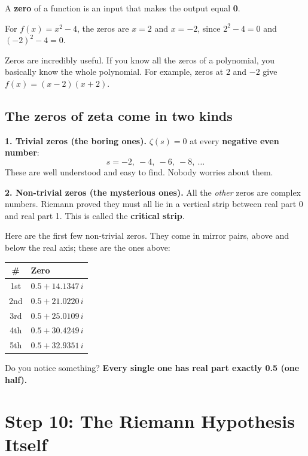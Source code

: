 \documentclass[11pt,a4paper]{article}
\begin{document}
A \textbf{zero} of a function is an input that makes the output equal \textbf{0}.

\begin{example}
For $f(x) = x^2 - 4$, the zeros are $x = 2$ and $x = -2$, since $2^2 - 4 = 0$ and $(-2)^2 - 4 = 0$.

Zeros are incredibly useful. If you know all the zeros of a polynomial, you basically know the whole polynomial. For example, zeros at $2$ and $-2$ give $f(x) = (x-2)(x+2)$.
\end{example}

\subsection*{The zeros of zeta come in two kinds}

\textbf{1. Trivial zeros (the boring ones).} $\zeta(s) = 0$ at every \textbf{negative even number}:
\[
s = -2,\ -4,\ -6,\ -8,\ \ldots
\]
These are well understood and easy to find. Nobody worries about them.

\textbf{2. Non-trivial zeros (the mysterious ones).} All the \emph{other} zeros are complex numbers. Riemann proved they must all lie in a vertical strip between real part 0 and real part 1. This is called the \textbf{critical strip}.

Here are the first few non-trivial zeros. They come in mirror pairs, above and below the real axis; these are the ones above:

\begin{center}
\begin{tabular}{c l}
\toprule
\# & Zero \\
\midrule
1st & $\mathbf{0.5} + 14.1347\,i$ \\
2nd & $\mathbf{0.5} + 21.0220\,i$ \\
3rd & $\mathbf{0.5} + 25.0109\,i$ \\
4th & $\mathbf{0.5} + 30.4249\,i$ \\
5th & $\mathbf{0.5} + 32.9351\,i$ \\
\bottomrule
\end{tabular}
\end{center}

Do you notice something? \textbf{Every single one has real part exactly 0.5 (one half).}

\section{Step 10: The Riemann Hypothesis Itself}
\end{document}
